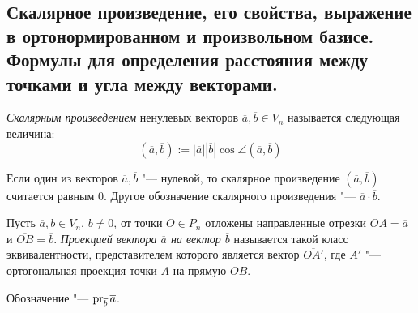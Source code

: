 \subsection{Скалярное произведение, его свойства, выражение в ортонормированном и произвольном базисе. Формулы для определения расстояния между точками и угла между векторами.}

    \begin{definition}
    	\textit{Скалярным произведением} ненулевых векторов $\overline{a}, \overline{b} \in V_n$ называется следующая величина:
    	\[(\overline{a}, \overline{b}) := |\overline{a}||\overline{b}|\cos{\angle(\overline{a}, \overline{b})}\]
    	
    	Если один из векторов $\overline{a}, \overline{b}$ "--- нулевой, то скалярное произведение $(\overline{a}, \overline{b})$ считается равным $0$. Другое обозначение скалярного произведения "--- $\overline a \cdot \overline{b}$.
    \end{definition}

    \begin{definition}
    	Пусть $\overline{a}, \overline{b} \in V_n$, $\overline{b} \ne \overline{0}$, от точки $O \in P_n$ отложены направленные отрезки $\overline{OA} = \overline{a}$ и $\overline{OB} = \overline{b}$. \textit{Проекцией вектора $\overline{a}$ на вектор $\overline{b}$} называется такой класс эквивалентности, представителем которого является вектор $\overline{OA'}$, где $A'$ "--- ортогональная проекция точки $A$ на прямую $OB$.
    	
    	\begin{center}
    	\end{center}
    	
    	Обозначение "--- $\operatorname{pr}_{\overline{b}}\overline{a}$.
    \end{definition}

